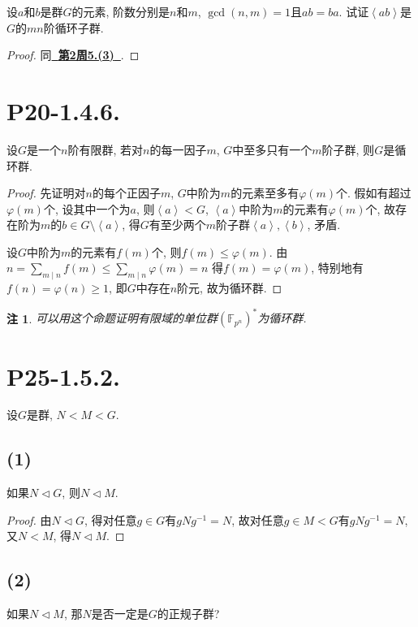 \documentclass[12pt, a4paper, fontset=windows]{ctexart}
\newcommand{\F}{\mathbb{F}}
\newcommand{\gen}[1]{\left\langle{#1}\right\rangle}
\newcommand{\myref}[2][]{\hyperref[#1]{\bf\color{blue}\ {#2}\ }}
\newtheorem*{remark}{注}
\begin{document}
设$a$和$b$是群$G$的元素, 阶数分别是$n$和$m$, 
$\gcd(n,m)=1$且$ab=ba$. 试证$\gen{ab}$是$G$的$mn$阶循环子群. 

\begin{proof}
同\myref[ord-mul]{第2周5.(3)}. 
\end{proof}

\section*{P20-1.4.6.}

设$G$是一个$n$阶有限群, 若对$n$的每一因子$m$, 
$G$中至多只有一个$m$阶子群, 则$G$是循环群. 

\begin{proof}
先证明对$n$的每个正因子$m$, $G$中阶为$m$的元素至多有$\varphi(m)$个. 
假如有超过$\varphi(m)$个, 设其中一个为$a$, 则$\gen{a}<G$, 
$\gen{a}$中阶为$m$的元素有$\varphi(m)$个, 故存在阶为$m$的$b\in G\setminus\gen{a}$, 
得$G$有至少两个$m$阶子群$\gen{a},\gen{b}$, 矛盾. 

设$G$中阶为$m$的元素有$f(m)$个, 则$f(m)\le\varphi(m)$. 由
$n=\sum_{m\mid n}f(m)\le\sum_{m\mid n}\varphi(m)=n$
得$f(m)=\varphi(m)$, 特别地有$f(n)=\varphi(n)\ge 1$, 
即$G$中存在$n$阶元, 故为循环群. 
\end{proof}

\begin{remark}
可以用这个命题证明有限域的单位群$(\F_{p^n})^*$为循环群. 
\end{remark}

\section*{P25-1.5.2.}

设$G$是群, $N<M<G$. 

\subsection*{(1)}

如果$N\lhd G$, 则$N\lhd M$. 

\begin{proof}
由$N\lhd G$, 得对任意$g\in G$有$gNg^{-1}=N$, 
故对任意$g\in M<G$有$gNg^{-1}=N$, 又$N<M$, 得$N\lhd M$. 
\end{proof}

\subsection*{(2)}

如果$N\lhd M$, 那$N$是否一定是$G$的正规子群? 
\end{document}
